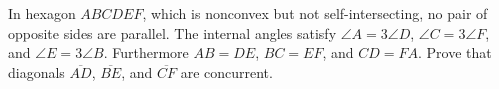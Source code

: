 In hexagon $ABCDEF$,  which is nonconvex but not self-intersecting, no pair of opposite sides are parallel.  The internal angles satisfy $\angle A=3\angle D$,  $\angle C=3\angle F$,  and $\angle E=3\angle B$.  Furthermore $AB=DE$,  $BC=EF$,  and $CD=FA$.  Prove that diagonals $\overline{AD}$,  $\overline{BE}$,  and $\overline{CF}$ are concurrent.